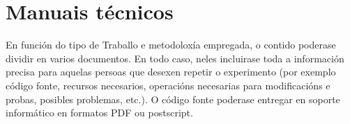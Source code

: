\chapter{Manuais técnicos}

En función do tipo de Traballo e metodoloxía empregada, o contido poderase dividir en varios documentos. En todo caso, neles incluirase toda a información precisa para aquelas persoas que desexen repetir o experimento (por exemplo código fonte, recursos necesarios, operacións necesarias para modificacións e probas, posibles problemas, etc.). O código fonte poderase entregar en soporte informático en formatos PDF ou postscript.